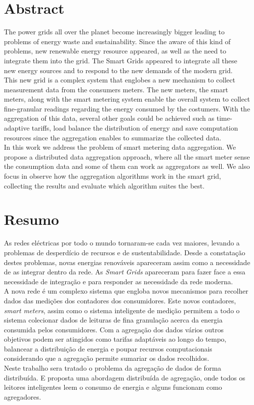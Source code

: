 \chapter*{Abstract}
 The power grids all over the planet become increasingly bigger leading to problems of energy waste and sustainability. Since the aware of this kind of problems, new renewable energy resource appeared, as well as the need to integrate them into the grid. The Smart Grids appeared to integrate all these new energy sources and to respond to the new demands of the modern grid. \\
This new grid is a complex system that englobes a new mechanism to collect measurement data from the consumers meters. The new meters, the smart meters, along with the smart metering system enable the overall system to collect fine-granular readings regarding the energy consumed by the costumers. With the aggregation of this data, several other goals could be achieved such as time-adaptive tariffs, load balance the distribution of energy and save computation resources since the aggregation enables to summarize the collected data.\\
In this work we address the problem of smart metering data aggregation. We propose a distributed data aggregation approach, where all the smart meter sense the consumption data and some of them can work as aggregators as well. We also focus in observe how the aggregation algorithms work in the smart grid, collecting the results and evaluate which algorithm suites the best.

	\cleardoublepage

\chapter*{Resumo}
	As redes eléctricas por todo o mundo tornaram-se cada vez maiores, levando a problemas de desperdício de recursos e de sustentabilidade. Desde a constatação destes problemas, novas energias  renováveis apareceram assim como a necessidade de as integrar dentro da rede. As \textit{Smart Grids} apareceram para fazer face a essa necessidade de integração e para responder as necessidade da rede moderna.\\
	A nova rede é um complexo sistema que engloba novos mecanismos para recolher dados das medições dos contadores dos consumidores. Este novos contadores, \textit{smart meters}, assim como o sistema inteligente de medição permitem a todo o sistema colecionar dados de leituras de fina granulação acerca da energia consumida pelos consumidores. Com a agregação dos dados vários outros objetivos podem ser atingidos como tarifas adaptáveis ao longo do tempo, balancear a distribuição de energia e poupar recursos computacionais considerando que a agregação permite sumariar os dados recolhidos.\\
	Neste trabalho sera tratado o problema da agregação de dados de forma distribuída.  E proposta uma abordagem distribuída de agregação, onde todos os leitores inteligentes leem o consumo de energia e alguns funcionam como agregadores.

